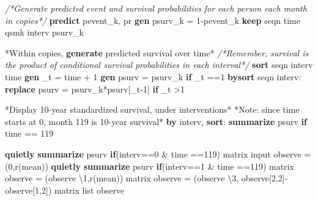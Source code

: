 \documentclass[
  10pt,
]{book}
\newenvironment{Shaded}{\begin{snugshade}}{\end{snugshade}}
\newcommand{\BaseNTok}[1]{\textcolor[rgb]{0.00,0.00,0.81}{#1}}
\newcommand{\CommentTok}[1]{\textcolor[rgb]{0.56,0.35,0.01}{\textit{#1}}}
\newcommand{\FunctionTok}[1]{\textcolor[rgb]{0.00,0.00,0.00}{#1}}
\newcommand{\KeywordTok}[1]{\textcolor[rgb]{0.13,0.29,0.53}{\textbf{#1}}}
\newcommand{\NormalTok}[1]{#1}
\newcommand{\OtherTok}[1]{\textcolor[rgb]{0.56,0.35,0.01}{#1}}
\begin{document}
\begin{Shaded}
\begin{Highlighting}[]
\CommentTok{/*Generate predicted event and survival probabilities }
\CommentTok{for each person each month in copies*/}
\KeywordTok{predict}\NormalTok{ pevent\_k, pr}
\KeywordTok{gen}\NormalTok{ psurv\_k = 1{-}pevent\_k}
\KeywordTok{keep}\NormalTok{ seqn time qsmk interv psurv\_k }

\NormalTok{*Within copies, }\KeywordTok{generate}\NormalTok{ predicted survival }\BaseNTok{over}\NormalTok{ time*}
\CommentTok{/*Remember, survival is the product of conditional survival}
\CommentTok{probabilities in each interval*/}
\KeywordTok{sort}\NormalTok{ seqn interv time}
\KeywordTok{gen}\NormalTok{ \_t = time + 1}
\KeywordTok{gen}\NormalTok{ psurv = psurv\_k }\KeywordTok{if}\NormalTok{ \_t ==1       }
\KeywordTok{bysort}\NormalTok{ seqn interv: }\KeywordTok{replace}\NormalTok{ psurv = psurv\_k*psurv[\_t{-}1] }\KeywordTok{if}\NormalTok{ \_t \textgreater{}1 }

\NormalTok{*Display 10{-}}\FunctionTok{year}\NormalTok{ standardized survival, under interventions*}
\NormalTok{*Note: since time starts }\FunctionTok{at}\NormalTok{ 0, }\FunctionTok{month}\NormalTok{ 119 is 10{-}}\FunctionTok{year}\NormalTok{ survival*}
\KeywordTok{by}\NormalTok{ interv, }\KeywordTok{sort}\NormalTok{: }\KeywordTok{summarize}\NormalTok{ psurv }\KeywordTok{if}\NormalTok{ time == 119}

\KeywordTok{quietly} \KeywordTok{summarize}\NormalTok{ psurv }\KeywordTok{if}\NormalTok{(interv==0 \& time ==119)}
\FunctionTok{matrix}\NormalTok{ input observe = (0,}\OtherTok{\textasciigrave{}r(mean)\textquotesingle{}}\NormalTok{)}
\KeywordTok{quietly} \KeywordTok{summarize}\NormalTok{ psurv }\KeywordTok{if}\NormalTok{(interv==1 \& time ==119)}
\FunctionTok{matrix}\NormalTok{ observe = (observe \textbackslash{}1,}\OtherTok{\textasciigrave{}r(mean)\textquotesingle{}}\NormalTok{)}
\FunctionTok{matrix}\NormalTok{ observe = (observe \textbackslash{}3, observe[2,2]{-}observe[1,2]) }
\FunctionTok{matrix} \OtherTok{list}\NormalTok{ observe}


\end{Highlighting}
\end{Shaded}
\end{document}
